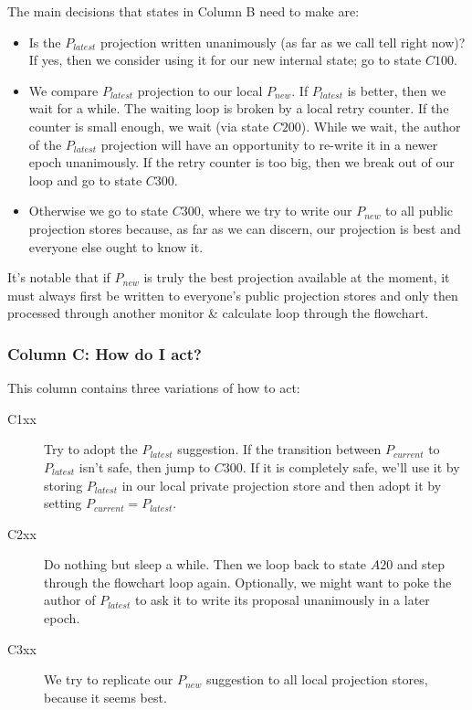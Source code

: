 \documentclass[preprint,10pt]{sigplanconf}
\begin{document}
The main decisions that states in Column B need to make are:

\begin{itemize}

\item Is the $P_{latest}$ projection written unanimously (as far as we
  call tell right now)?  If yes, then we consider
  using it for our new internal state; go to state $C100$.

\item We compare $P_{latest}$ projection to our local $P_{new}$.
  If $P_{latest}$ is better,
  then we wait for a while.  The waiting loop is broken by a local
  retry counter.  If the counter is small enough, we wait (via state
  $C200$).  While we wait, the author of the $P_{latest}$ projection will
  have an opportunity to re-write it in a newer epoch
  unanimously.  If the retry counter is too big, then we break out of
  our loop and go to state $C300$.

\item Otherwise we go to state $C300$, where we try to write our
  $P_{new}$ to all public projection stores because, as far as we can
  discern, our projection is best and everyone else ought to know it.

\end{itemize}

It's notable that if $P_{new}$ is truly the best projection available
at the moment, it must always first be written to everyone's
public projection stores and only then processed through another
monitor \& calculate loop through the flowchart.

\subsubsection{Column C: How do I act?}

This column contains three variations of how to act:

\begin{description}

\item[C1xx] Try to adopt the $P_{latest}$ suggestion.  If the
  transition between $P_{current}$ to $P_{latest}$ isn't safe, then
  jump to $C300$.  If it is completely safe, we'll use it by storing
  $P_{latest}$ in our local private projection store and then adopt it
  by setting $P_{current} = P_{latest}$.

\item[C2xx] Do nothing but sleep a while.  Then we loop back to state
  $A20$ and step through the flowchart loop again.  Optionally, we
  might want to poke the author of $P_{latest}$ to ask it to write
  its proposal unanimously in a later epoch.

\item[C3xx] We try to replicate our $P_{new}$ suggestion to all local
  projection stores, because it seems best.

\end{description}
\end{document}
